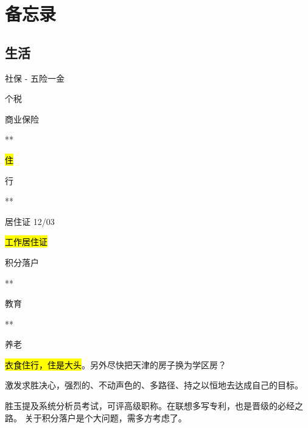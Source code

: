 \chapter{备忘录}

\section{生活}

\begin{enumbox}
\item 社保 - 五险一金
\item 个税
\item 商业保险
\item ***
\item \hl{住}
\item 行
\item ***
\item 居住证 12/03
\item \hl{工作居住证}
\item 积分落户
\item ***
\item 教育
\item ***
\item 养老
\end{enumbox}

\hl{衣食住行，住是大头}。另外尽快把天津的房子换为学区房？

\hrulefill

激发求胜决心，强烈的、不动声色的、多路径、持之以恒地去达成自己的目标。

胜玉提及系统分析员考试，可评高级职称。在联想多写专利，也是晋级的必经之路。
关于积分落户是个大问题，需多方考虑了。
